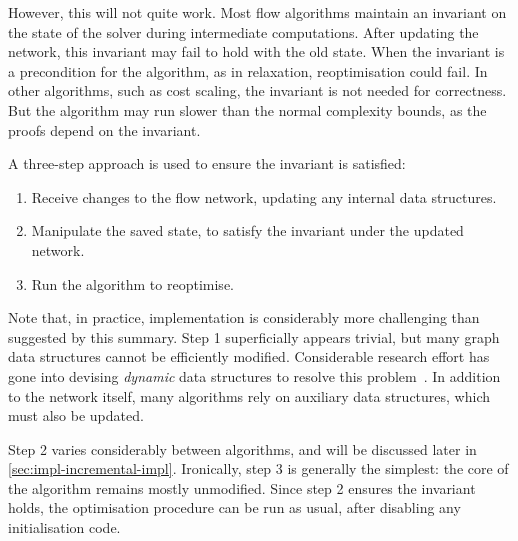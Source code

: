 However, this will not quite work. Most flow algorithms maintain an invariant on the state of the solver during intermediate computations. After updating the network, this invariant may fail to hold with the old state. When the invariant is a precondition for the algorithm, as in relaxation, reoptimisation could fail. In other algorithms, such as cost scaling, the invariant is not needed for correctness. But the algorithm may run slower than the normal complexity bounds, as the proofs depend on the invariant. 

A three-step approach is used to ensure the invariant is satisfied:

\begin{enumerate}
    \item Receive changes to the flow network, updating any internal data structures.
    \item Manipulate the saved state, to satisfy the invariant under the updated network.
    \item Run the algorithm to reoptimise.
\end{enumerate}

Note that, in practice, implementation is considerably more challenging than suggested by this summary. Step 1 superficially appears trivial, but many graph data structures cannot be efficiently modified. Considerable research effort has gone into devising \emph{dynamic} data structures to resolve this problem~\cite{Tarjan:1983,Eppstein:1996}. In addition to the network itself, many algorithms rely on auxiliary data structures\footnotemark, which must also be updated.

Step 2 varies considerably between algorithms, and will be discussed later in \cref{sec:impl-incremental-impl}. Ironically, step 3 is generally the simplest: the core of the algorithm remains mostly unmodified. Since step 2 ensures the invariant holds, the optimisation procedure can be run as usual, after disabling any initialisation code.


